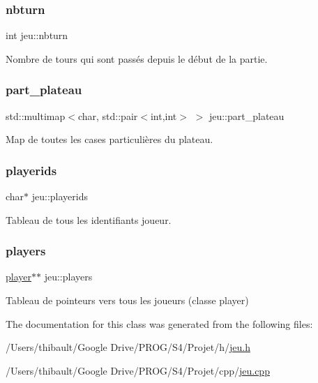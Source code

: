 \subsubsection{\texorpdfstring{nbturn}{nbturn}}
{\footnotesize\ttfamily int jeu\+::nbturn\hspace{0.3cm}{\ttfamily [private]}}



Nombre de tours qui sont passés depuis le début de la partie. 

\mbox{\label{classjeu_abd8f4b8b02d750e302903f616e897ad0}} 
\subsubsection{\texorpdfstring{part\+\_\+plateau}{part\_plateau}}
{\footnotesize\ttfamily std\+::multimap$<$char, std\+::pair$<$int,int$>$ $>$ jeu\+::part\+\_\+plateau\hspace{0.3cm}{\ttfamily [private]}}



Map de toutes les cases particulières du plateau. 

\mbox{\label{classjeu_ada4888da3a6c7036f47f47515f87a983}} 
\subsubsection{\texorpdfstring{playerids}{playerids}}
{\footnotesize\ttfamily char$\ast$ jeu\+::playerids\hspace{0.3cm}{\ttfamily [private]}}



Tableau de tous les identifiants joueur. 

\mbox{\label{classjeu_ae005d31d8935c2d9e7ddb53d25efcc31}} 
\subsubsection{\texorpdfstring{players}{players}}
{\footnotesize\ttfamily \hyperlink{classplayer}{player}$\ast$$\ast$ jeu\+::players\hspace{0.3cm}{\ttfamily [private]}}



Tableau de pointeurs vers tous les joueurs (classe player) 



The documentation for this class was generated from the following files\+:\begin{DoxyCompactItemize}
\item 
/\+Users/thibault/\+Google Drive/\+P\+R\+O\+G/\+S4/\+Projet/h/\hyperlink{jeu_8h}{jeu.\+h}\item 
/\+Users/thibault/\+Google Drive/\+P\+R\+O\+G/\+S4/\+Projet/cpp/\hyperlink{jeu_8cpp}{jeu.\+cpp}\end{DoxyCompactItemize}
